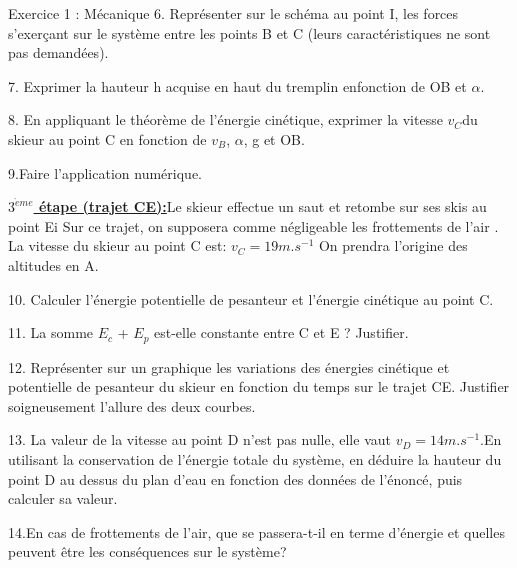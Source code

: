 \documentclass[12pt, french]{article}
\begin{document}
\begin{Box2}{Exercice 1 : Mécanique }
\vspace{0.2cm}
6. Représenter sur le schéma au point I, les forces s’exerçant sur le système entre les points B et C (leurs caractéristiques ne sont pas demandées).

7. Exprimer la hauteur h acquise en haut du tremplin enfonction de OB et $\alpha$.

8. En appliquant le théorème de l’énergie cinétique, exprimer la vitesse $v_C$du skieur au point C en fonction de $v_B$, $\alpha$, g et OB.

9.Faire l’application numérique.

\vspace{0.2cm}
   \underline{  \textbf{ $3^{\grave{e}me}$ étape (trajet CE):}}Le skieur effectue un saut et retombe sur ses skis au point Ei Sur ce trajet, on supposera comme négligeable les frottements de l’air . La vitesse du skieur au point C est:  $v_C= 19 m.s^{-1}$ On prendra l’origine des altitudes en A.

10. Calculer l’énergie potentielle de pesanteur et l’énergie cinétique au point C.

11. La somme $E_c$ + $E_p$ est-elle constante entre C et E ? Justifier.

12. Représenter sur un graphique les variations des énergies cinétique et potentielle de pesanteur du skieur en fonction du temps sur le trajet CE. Justifier soigneusement l’allure des deux courbes.

13. La valeur de la vitesse au point D n’est pas nulle, elle vaut $v_D= 14 m.s^{-1}$.En utilisant la conservation de l’énergie totale du système, en déduire la hauteur du point D au dessus du plan d’eau en fonction des données de l’énoncé, puis calculer sa valeur.

14.En cas de frottements de l’air, que se passera-t-il en terme d’énergie et quelles peuvent être les conséquences sur le système?
\end{Box2}

\end{document}
